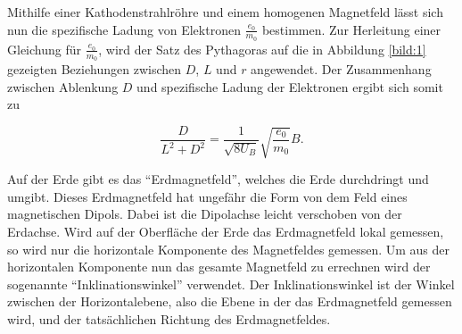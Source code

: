 Mithilfe einer Kathodenstrahlröhre und einem homogenen Magnetfeld lässt sich nun
die spezifische Ladung von Elektronen $\frac{e_0}{m_0}$ bestimmen.
Zur Herleitung einer Gleichung für $\frac{e_0}{m_0}$, wird der Satz des Pythagoras
auf die in Abbildung \ref{bild:1} gezeigten Beziehungen zwischen $D$, $L$ und $r$ angewendet.
Der Zusammenhang zwischen Ablenkung $D$ und spezifische Ladung der Elektronen ergibt sich somit zu

\begin{equation}
  \frac{D}{L^2 + D^2} = \frac{1}{\sqrt{8 U_B}} \sqrt{\frac{e_0}{m_0}} B.
  \label{eq:3}
\end{equation}

\newpage

Auf der Erde gibt es das \enquote{Erdmagnetfeld}, welches die Erde durchdringt und umgibt.
Dieses Erdmagnetfeld hat ungefähr die Form von dem Feld eines magnetischen Dipols. Dabei ist die
Dipolachse leicht verschoben von der Erdachse.
Wird auf der Oberfläche der Erde das Erdmagnetfeld lokal gemessen, so wird nur die horizontale Komponente des
Magnetfeldes gemessen. Um aus der horizontalen Komponente nun das gesamte Magnetfeld zu errechnen
wird der sogenannte \enquote{Inklinationswinkel} verwendet. Der Inklinationswinkel
ist der Winkel zwischen der Horizontalebene, also die Ebene in der das Erdmagnetfeld gemessen wird,
und der tatsächlichen Richtung des Erdmagnetfeldes.
